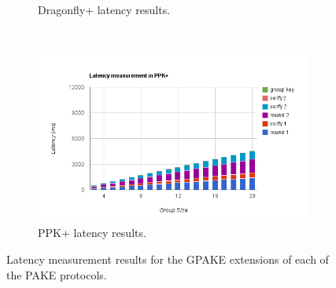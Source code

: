 \begin{figure}
\begin{subfigure}[b]{0.5\textwidth}
        \caption{Dragonfly+ latency results.}
        \label{fig:dragon_results}
    \end{subfigure}
    ~
    \begin{subfigure}[b]{0.5\textwidth}
        \centering
        \includegraphics[width=\textwidth]{benchmark/scale_ppk.png}
        \caption{PPK+ latency results.}
        \label{fig:ppk_results}
    \end{subfigure}
    \caption{Latency measurement results for the GPAKE extensions of each of the PAKE protocols.}
    \label{fig:results}
\end{figure}


